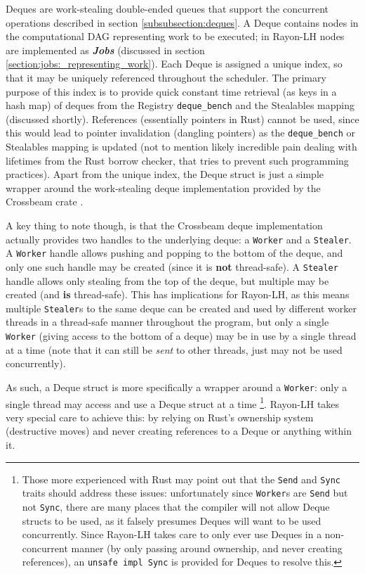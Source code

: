 \documentclass[bsc,frontabs,singlespacing,parskip,deptreport,normalheadings]{infthesis}
\begin{document}
Deques are work-stealing double-ended queues that support the concurrent
operations described in section \ref{subsubsection:deques}. A Deque contains
nodes in the computational DAG representing work to be executed; in Rayon-LH
nodes are implemented as \textit{\textbf{Jobs}} (discussed in section
\ref{section:jobs:_representing_work}). Each Deque is assigned a unique index,
so that it may be uniquely referenced throughout the scheduler. The primary
purpose of this index is to provide quick constant time retrieval (as keys in a
hash map) of deques from the Registry \texttt{deque\_bench} and the Stealables
mapping (discussed shortly). References (essentially pointers in Rust) cannot be
used, since this would lead to pointer invalidation (dangling pointers) as the
\texttt{deque\_bench} or Stealables mapping is updated (not to mention likely
incredible pain dealing with lifetimes from the Rust borrow checker, that tries
to prevent such programming practices). Apart from the unique index, the Deque
struct is just a simple wrapper around the work-stealing deque implementation
provided by the Crossbeam crate \cite{noauthor_crossbeam_2022}.

A key thing to note though, is that the Crossbeam deque implementation actually
provides two handles to the underlying deque: a \texttt{Worker} and a
\texttt{Stealer}. A \texttt{Worker} handle allows pushing and popping to the
bottom of the deque, and only one such handle may be created (since it is
\textbf{not} thread-safe). A \texttt{Stealer} handle allows only stealing from
the top of the deque, but multiple may be created (and \textbf{is} thread-safe).
This has implications for Rayon-LH, as this means multiple \texttt{Stealer}s to
the same deque can be created and used by different worker threads in a
thread-safe manner throughout the program, but only a single \texttt{Worker}
(giving access to the bottom of a deque) may be in use by a single thread at a
time (note that it can still be \textit{sent} to other threads, just may not be
used concurrently).

As such, a Deque struct is more specifically a wrapper around a \texttt{Worker}:
only a single thread may access and use a Deque struct at a time \footnote{Those
    more experienced with Rust may point out that the \texttt{Send} and
    \texttt{Sync} traits should address these issues: unfortunately since
    \texttt{Worker}s are \texttt{Send} but not \texttt{Sync}, there are many
    places that the compiler will not allow Deque structs to be used, as it
    falsely presumes Deques will want to be used concurrently. Since Rayon-LH
takes care to only ever use Deques in a non-concurrent manner (by only passing
around ownership, and never creating references), an \texttt{unsafe impl Sync}
is provided for Deques to resolve this.}. Rayon-LH takes very special care to
achieve this: by relying on Rust's ownership system (destructive moves) and
never creating references to a Deque or anything within it.
\end{document}
